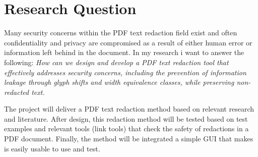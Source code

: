 \section{Research Question}

Many security concerns within the PDF text redaction field exist and often confidentiality and privacy are compromised as a result of either human error or information left behind in the document. In my research i want to answer the following: \textit{How can we design and develop a PDF text redaction tool that effectively addresses security concerns, including the prevention of information leakage through glyph shifts and width equivalence classes, while preserving non-redacted text.} 

The project will deliver a PDF text redaction method based on relevant research and literature. After design, this redaction method will be tested based on test examples and relevant tools (link tools) that check the safety of redactions in a PDF document. Finally, the method will be integrated a simple GUI that makes is easily usable to use and test. 